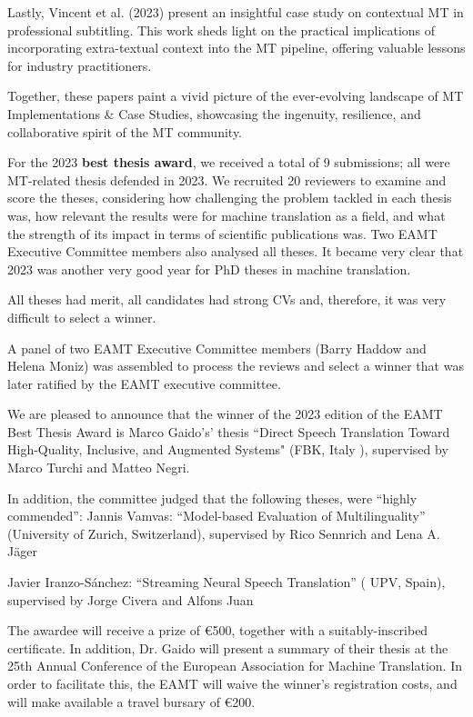 Lastly, Vincent et al. (2023) present an insightful case study on contextual MT in professional subtitling. This work sheds light on the practical implications of incorporating extra-textual context into the MT pipeline, offering valuable lessons for industry practitioners.

Together, these papers paint a vivid picture of the ever-evolving landscape of MT Implementations \& Case Studies, showcasing the ingenuity, resilience, and collaborative spirit of the MT community.

For the 2023 {\bf best thesis award}, we received a total of 9 submissions; all were MT-related thesis defended in 2023.  We recruited 20 reviewers to examine and score the theses, considering how challenging the problem tackled in each thesis was, how relevant the results were for machine translation as a field, and what the strength of its impact in terms of scientific publications was. Two EAMT Executive Committee members also analysed all theses. It became very clear that 2023 was another very good year for PhD theses in machine translation. 

All theses had merit, all candidates had strong CVs and, therefore, it was very difficult to select a winner.

A panel of two EAMT Executive Committee members (Barry Haddow and Helena Moniz) was assembled to process the reviews and select a winner that was later ratified by the EAMT executive committee.

We are pleased to announce that the winner of the 2023 edition of the EAMT Best Thesis Award is Marco Gaido’s' thesis “Direct Speech Translation Toward High-Quality, Inclusive, and Augmented Systems" (FBK, Italy ), supervised by Marco Turchi and Matteo Negri.

In addition, the committee judged  that the following theses, were “highly commended”:
Jannis Vamvas: “Model-based Evaluation of Multilinguality” (University of Zurich, Switzerland), supervised by Rico Sennrich and Lena A. Jäger

Javier Iranzo-Sánchez: “Streaming Neural Speech Translation” ( UPV, Spain), supervised by Jorge Civera and Alfons Juan 


The awardee will receive a prize of €500, together with a suitably-inscribed certificate. In addition, Dr. Gaido will present a summary of their thesis at the 25th Annual Conference of the European Association for Machine Translation.  In order to facilitate this, the EAMT will waive the winner's registration costs, and will make available a travel bursary of €200.

